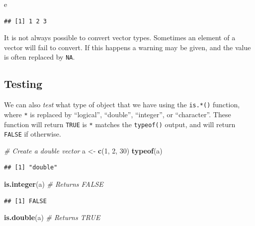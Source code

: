 \documentclass[
]{book}
\newenvironment{Shaded}{\begin{snugshade}}{\end{snugshade}}
\newcommand{\CommentTok}[1]{\textcolor[rgb]{0.56,0.35,0.01}{\textit{#1}}}
\newcommand{\DecValTok}[1]{\textcolor[rgb]{0.00,0.00,0.81}{#1}}
\newcommand{\KeywordTok}[1]{\textcolor[rgb]{0.13,0.29,0.53}{\textbf{#1}}}
\newcommand{\NormalTok}[1]{#1}
\newcommand{\StringTok}[1]{\textcolor[rgb]{0.31,0.60,0.02}{#1}}
\begin{document}
\begin{Shaded}
\begin{Highlighting}[]
\NormalTok{e}
\end{Highlighting}
\end{Shaded}

\begin{verbatim}
## [1] 1 2 3
\end{verbatim}

It is not always possible to convert vector types. Sometimes an element of a vector will fail to convert. If this happens a warning may be given, and the value is often replaced by \texttt{NA}.

\hypertarget{testing}{%
\subsection{Testing}\label{testing}}

We can also \emph{test} what type of object that we have using the \texttt{is.*()} function, where \texttt{*} is replaced by ``logical'', ``double'', ``integer'', or ``character''. These function will return \texttt{TRUE} is \texttt{*} matches the \texttt{typeof()} output, and will return \texttt{FALSE} if otherwise.

\begin{Shaded}
\begin{Highlighting}[]
\CommentTok{# Create a double vector}
\NormalTok{a <-}\StringTok{ }\KeywordTok{c}\NormalTok{(}\DecValTok{1}\NormalTok{, }\DecValTok{2}\NormalTok{, }\DecValTok{30}\NormalTok{)}
\KeywordTok{typeof}\NormalTok{(a)}
\end{Highlighting}
\end{Shaded}

\begin{verbatim}
## [1] "double"
\end{verbatim}

\begin{Shaded}
\begin{Highlighting}[]
\KeywordTok{is.integer}\NormalTok{(a)  }\CommentTok{# Returns FALSE}
\end{Highlighting}
\end{Shaded}

\begin{verbatim}
## [1] FALSE
\end{verbatim}

\begin{Shaded}
\begin{Highlighting}[]
\KeywordTok{is.double}\NormalTok{(a)  }\CommentTok{# Returns TRUE}
\end{Highlighting}
\end{Shaded}
\end{document}
